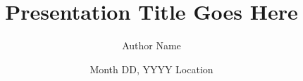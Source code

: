 
\title{Presentation Title Goes Here}
\author{Author Name}
\date{Month DD, YYYY \textperiodcentered{} Location}

\newcommand{\eventname}{Event Name}                 %
\newcommand{\eventfull}{Full Conference / Event Name}%

\newcommand{\contactemail}{firstname.lastname@uni.lu}
\newcommand{\contactweb}{www.uni.lu/snt}
